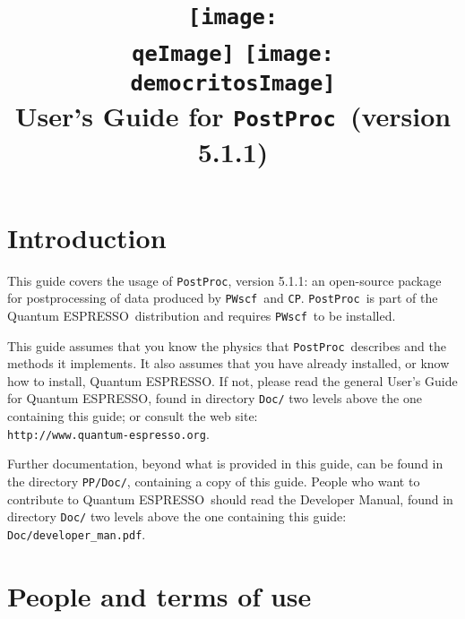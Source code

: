 \documentclass[12pt,a4paper]{article}
\def\version{5.1.1}
\def\qe{{\sc Quantum ESPRESSO}}
\def\PWscf{\texttt{PWscf}}
\def\CP{\texttt{CP}}
\def\PostProc{\texttt{PostProc}}
\begin{document}
 
\author{}
\date{}

\def\qeImage{../../Doc/quantum_espresso.pdf}
\def\democritosImage{../../Doc/democritos.pdf}

\begin{htmlonly}
\def\qeImage{quantum_espresso.png}
\def\democritosImage{democritos.png}
\end{htmlonly}

\title{
  \texttt{[image: \\qeImage]} \hskip 2cm
  \texttt{[image: \\democritosImage]}\\
  \vskip 1cm
  \Huge User's Guide for \PostProc\
  \Large (version \version)
}


\maketitle

\tableofcontents

\section{Introduction}

This guide covers the usage of \PostProc, version \version: 
an open-source package for postprocessing of data produced by
\PWscf\ and \CP. \PostProc\ is part of the \qe\ distribution 
and requires \PWscf\ to be installed.

This guide assumes that you know the physics 
that \PostProc\ describes and the methods it implements.
It also assumes  that you have already installed,
or know how to install, \qe. If not, please read
the general User's Guide for \qe, found in 
directory \texttt{Doc/} two levels above the 
one containing this guide; or consult the web site:\\
\texttt{http://www.quantum-espresso.org}.

Further documentation, beyond what is provided 
in this guide, can be found in the directory
\texttt{PP/Doc/}, containing a copy of this guide.
People who want to contribute to \qe\ should read the 
Developer Manual, found in directory \texttt{Doc/} two levels
above the one containing this guide: \texttt{Doc/developer\_man.pdf}.

\section{People and terms of use}
\end{document}
